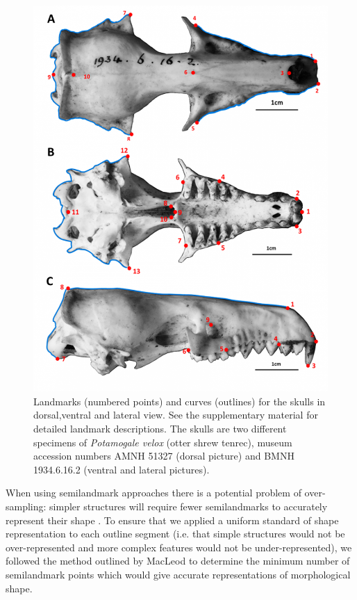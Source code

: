 \documentclass[12pt,a4paper]{article}
\begin{document}
	\begin{figure}[!htbp]
		\centering
		\includegraphics[width=1\linewidth]{figures/skdors+skvent+sklat_col_light_labels_resize.png}
		\caption[Skulls: dorsal, ventral and lateral landmarks]
		{Landmarks (numbered points) and curves (outlines) for the skulls in dorsal,ventral and lateral view. See the supplementary material for detailed landmark descriptions. The skulls are two different specimens of \textit{Potamogale velox} (otter shrew tenrec), museum accession numbers AMNH 51327 (dorsal picture) and BMNH 1934.6.16.2 (ventral and lateral pictures). }
		\label{fig:landmarks}
	\end{figure}

	When using semilandmark approaches there is a potential problem of over-sampling: simpler structures will require fewer semilandmarks to accurately represent their shape \citep{MacLeod2012}. To ensure that we applied a uniform standard of shape representation to each outline segment (i.e. that simple structures would not be over-represented and more complex features would not be under-represented), we followed the method outlined by MacLeod \citeyearpar{MacLeod2012} to determine the minimum number of semilandmark points which would give accurate representations of morphological shape.
	
\end{document}
